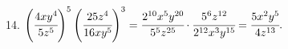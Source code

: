 14. $\left(\cfrac{4xy^4}{5z^5}\right)^5\left(\cfrac{25z^4}{16xy^5}\right)^3=\cfrac{2^{10}x^5y^{20}}{5^5z^{25}}\cdot\cfrac{5^6z^{12}}{2^{12}x^3y^{15}}=\cfrac{5x^2y^5}{4z^{13}}.$\\
